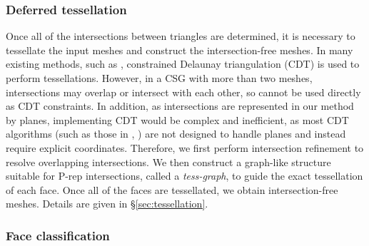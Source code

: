 \subsubsection{Deferred tessellation}


Once all of the intersections between triangles are determined, it is necessary to tessellate the input meshes and construct the intersection-free meshes. In many existing methods, such as \cite{ogayar2015deferred}, constrained Delaunay triangulation (CDT) is used to perform tessellations. However, in a CSG with more than two meshes, intersections may overlap or intersect with each other, so cannot be used directly as CDT constraints. In addition, as intersections are represented in our method by planes, implementing CDT would be complex and inefficient, as most CDT algorithms (such as those in \cite{chew1989constrained}, \cite{de1992line}) are not designed to handle planes and instead require explicit coordinates. Therefore, we first perform intersection refinement to resolve overlapping intersections. We then construct a graph-like structure suitable for P-rep intersections, called a \emph{tess-graph}, to guide the exact tessellation of each face. Once all of the faces are tessellated, we obtain intersection-free meshes. Details are given in \S\ref{sec:tessellation}.

\subsubsection{Face classification}

